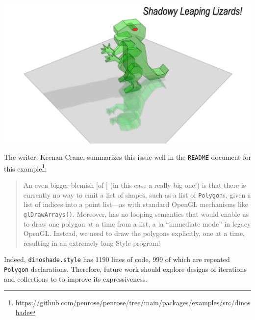 \includegraphics[width=.9\linewidth]{assets/penrose/dinoshade.png}

\noindent The \Style{} writer, Keenan Crane, summarizes this issue well in the \texttt{README} document for this example\footnote{\url{https://github.com/penrose/penrose/tree/main/packages/examples/src/dinoshade}}:

\begin{quote}
An even bigger blemish [of \Style{}] (in this case a really big one!) is that there is currently no way to emit a list of shapes, such as a list of \texttt{Polygon}s, given a list of indices into a point list—as with standard OpenGL mechanisms like \texttt{glDrawArrays()}. Moreover, \Style has no looping semantics that would enable us to draw one polygon at a time from a list, a la ``immediate mode'' in legacy OpenGL. Instead, we need to draw the polygons explicitly, one at a time, resulting in an extremely long Style program! 
\end{quote}

\noindent Indeed, \texttt{dinoshade.style} has 1190 lines of code, 999 of which are repeated \texttt{Polygon} declarations. Therefore, future work should explore designs of iterations and collections to \Style{} to improve its expressiveness.





